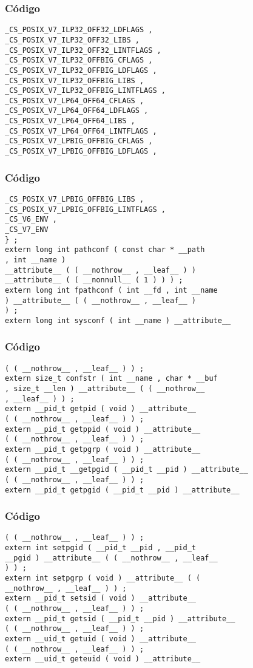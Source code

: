\documentclass{beamer}
\begin{document}
\begin{frame}[fragile]
\frametitle{C\'odigo}
\begin{verbatim}
_CS_POSIX_V7_ILP32_OFF32_LDFLAGS , 
_CS_POSIX_V7_ILP32_OFF32_LIBS , 
_CS_POSIX_V7_ILP32_OFF32_LINTFLAGS , 
_CS_POSIX_V7_ILP32_OFFBIG_CFLAGS , 
_CS_POSIX_V7_ILP32_OFFBIG_LDFLAGS , 
_CS_POSIX_V7_ILP32_OFFBIG_LIBS , 
_CS_POSIX_V7_ILP32_OFFBIG_LINTFLAGS , 
_CS_POSIX_V7_LP64_OFF64_CFLAGS , 
_CS_POSIX_V7_LP64_OFF64_LDFLAGS , 
_CS_POSIX_V7_LP64_OFF64_LIBS , 
_CS_POSIX_V7_LP64_OFF64_LINTFLAGS , 
_CS_POSIX_V7_LPBIG_OFFBIG_CFLAGS , 
_CS_POSIX_V7_LPBIG_OFFBIG_LDFLAGS , 
\end{verbatim}
\end{frame}
\begin{frame}[fragile]
\frametitle{C\'odigo}
\begin{verbatim}
_CS_POSIX_V7_LPBIG_OFFBIG_LIBS , 
_CS_POSIX_V7_LPBIG_OFFBIG_LINTFLAGS , 
_CS_V6_ENV , 
_CS_V7_ENV 
} ; 
extern long int pathconf ( const char * __path 
, int __name ) 
__attribute__ ( ( __nothrow__ , __leaf__ ) ) 
__attribute__ ( ( __nonnull__ ( 1 ) ) ) ; 
extern long int fpathconf ( int __fd , int __name 
) __attribute__ ( ( __nothrow__ , __leaf__ ) 
) ; 
extern long int sysconf ( int __name ) __attribute__ 
\end{verbatim}
\end{frame}
\begin{frame}[fragile]
\frametitle{C\'odigo}
\begin{verbatim}
( ( __nothrow__ , __leaf__ ) ) ; 
extern size_t confstr ( int __name , char * __buf 
, size_t __len ) __attribute__ ( ( __nothrow__ 
, __leaf__ ) ) ; 
extern __pid_t getpid ( void ) __attribute__ 
( ( __nothrow__ , __leaf__ ) ) ; 
extern __pid_t getppid ( void ) __attribute__ 
( ( __nothrow__ , __leaf__ ) ) ; 
extern __pid_t getpgrp ( void ) __attribute__ 
( ( __nothrow__ , __leaf__ ) ) ; 
extern __pid_t __getpgid ( __pid_t __pid ) __attribute__ 
( ( __nothrow__ , __leaf__ ) ) ; 
extern __pid_t getpgid ( __pid_t __pid ) __attribute__ 
\end{verbatim}
\end{frame}
\begin{frame}[fragile]
\frametitle{C\'odigo}
\begin{verbatim}
( ( __nothrow__ , __leaf__ ) ) ; 
extern int setpgid ( __pid_t __pid , __pid_t 
__pgid ) __attribute__ ( ( __nothrow__ , __leaf__ 
) ) ; 
extern int setpgrp ( void ) __attribute__ ( ( 
__nothrow__ , __leaf__ ) ) ; 
extern __pid_t setsid ( void ) __attribute__ 
( ( __nothrow__ , __leaf__ ) ) ; 
extern __pid_t getsid ( __pid_t __pid ) __attribute__ 
( ( __nothrow__ , __leaf__ ) ) ; 
extern __uid_t getuid ( void ) __attribute__ 
( ( __nothrow__ , __leaf__ ) ) ; 
extern __uid_t geteuid ( void ) __attribute__ 
\end{verbatim}
\end{frame}
\end{document}

